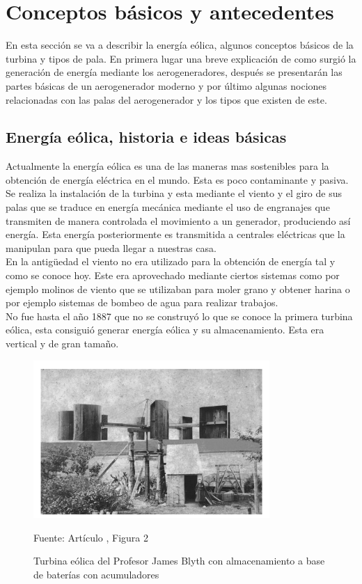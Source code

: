 \section{Conceptos básicos y antecedentes}

En esta sección se va a describir la energía eólica, algunos conceptos básicos de la turbina y tipos de pala. En primera lugar una breve explicación de como surgió la generación de energía mediante los aerogeneradores, después se presentarán las partes básicas de un aerogenerador moderno y por último algunas nociones relacionadas con las palas del aerogenerador y los tipos que existen de este.

\subsection{Energía eólica, historia e ideas básicas}

Actualmente la energía eólica es una de las maneras mas sostenibles para la obtención de energía eléctrica en el mundo. Esta es poco contaminante y pasiva. Se realiza la instalación de la turbina y esta mediante el viento y el giro de sus palas que se traduce en energía mecánica mediante el uso de engranajes que transmiten de manera controlada el movimiento a un generador, produciendo así energía. Esta energía posteriormente es transmitida a centrales eléctricas que la manipulan para que pueda llegar a nuestras casa.\\

En la antigüedad el viento no era utilizado para la obtención de energía tal y como se conoce hoy. Este era aprovechado mediante ciertos sistemas como por ejemplo molinos de viento que se utilizaban para moler grano y obtener harina o por ejemplo sistemas de bombeo de agua para realizar trabajos.\\

No fue hasta el año 1887 que no se construyó lo que se conoce la primera turbina eólica, esta consiguió generar energía eólica y su almacenamiento. Esta era vertical y de gran tamaño.

\begin{figure}[H] 
    \centering
    \includegraphics[width=0.8\textwidth]{images/1a turina eolica.PNG}
    \caption{Turbina eólica del Profesor James Blyth con almacenamiento a base de baterías con acumuladores}
    Fuente: Artículo \cite{1aturbina}, Figura 2
    \label{fig:pala_explicar_partes}
\end{figure}

